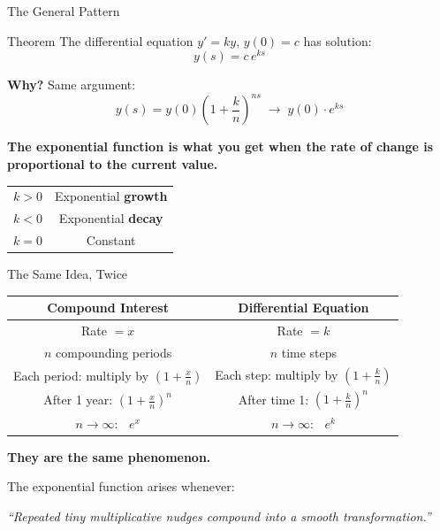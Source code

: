\documentclass[10pt]{beamer}
\theoremstyle{definition}
\newcommand{\x}[1]{\alert{\textbf{#1}}}
\begin{document}
\begin{frame}{The General Pattern}

\begin{block}{Theorem}
The differential equation $y' = ky$, \; $y(0) = c$ has solution:
$$y(s) = c\,e^{ks}$$
\end{block}

\vfill\pause

\textbf{Why?} Same argument:
$$y(s) = y(0)\left(1+\frac{k}{n}\right)^{ns} \;\longrightarrow\; y(0)\cdot e^{ks}$$

\vfill\pause

\x{The exponential function is what you get when the rate of change is proportional to the current value.}

\vfill

\begin{center}
\begin{tabular}{c|c}
$k > 0$ & Exponential \x{growth} \\
$k < 0$ & Exponential \x{decay} \\
$k = 0$ & Constant
\end{tabular}
\end{center}

\end{frame}


\begin{frame}{The Same Idea, Twice}

\begin{center}
\renewcommand{\arraystretch}{1.6}
\begin{tabular}{c|c}
\textbf{Compound Interest} & \textbf{Differential Equation} \\
\hline
Rate $= x$ & Rate $= k$ \\
$n$ compounding periods & $n$ time steps \\
Each period: multiply by $\left(1+\frac{x}{n}\right)$ & Each step: multiply by $\left(1+\frac{k}{n}\right)$ \\
After 1 year: $\left(1+\frac{x}{n}\right)^n$ & After time 1: $\left(1+\frac{k}{n}\right)^n$ \\
$n\to\infty$: $\;\;e^x$ & $n\to\infty$: $\;\;e^k$
\end{tabular}
\end{center}

\vfill\pause

\x{They are the same phenomenon.}

\vfill

The exponential function arises whenever:
\begin{center}
\it ``Repeated tiny multiplicative nudges compound into a smooth transformation.''
\end{center}

\end{frame}
\end{document}
